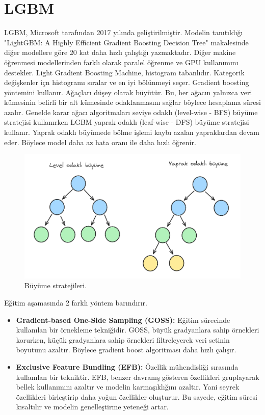 \section{LGBM}
LGBM, Microsoft tarafından 2017 yılında geliştirilmiştir. Modelin tanıtıldığı "LightGBM: A Highly Efficient Gradient Boosting Decision Tree" makalesinde diğer modellere göre 20 kat daha hızlı çalıştığı yazmaktadır. Diğer makine öğrenmesi modellerinden farklı olarak paralel öğrenme ve GPU kullanımını destekler. Light Gradient Boosting Machine, histogram tabanlıdır.  Kategorik değişkenler içn histogramı sıralar ve en iyi bölünmeyi seçer. Gradient boosting yöntemini kullanır. Ağaçları düşey olarak büyütür. Bu, her ağacın yalnızca veri kümesinin belirli bir alt kümesinde odaklanmasını sağlar böylece hesaplama süresi azalır.  Genelde karar ağacı algoritmaları seviye odaklı (level-wise - BFS) büyüme stratejisi kullanırken LGBM yaprak odaklı (leaf-wise - DFS) büyüme stratejisi kullanır. Yaprak odaklı büyümede bölme işlemi kaybı azalan yapraklardan devam eder. Böylece model daha az hata oranı ile daha hızlı öğrenir.

\begin{figure}[h]
    \centering
    \includegraphics[width=1\textwidth]{images/grow_strategies.png}
    \caption{Büyüme stratejileri.}
    \label{fig:enter-label}
\end{figure}

Eğitim aşamasında 2 farklı yöntem barındırır.
\begin{itemize}
    \item \textbf{Gradient-based One-Side Sampling (GOSS):} Eğitim sürecinde kullanılan bir örnekleme tekniğidir. GOSS, büyük gradyanlara sahip örnekleri korurken, küçük gradyanlara sahip örnekleri filtreleyerek veri setinin boyutunu azaltır. Böylece gradient boost algoritması daha hızlı çalışır.
    \item \textbf{Exclusive Feature Bundling (EFB):} Özellik mühendisliği sırasında kullanılan bir tekniktir. EFB, benzer davranış gösteren özellikleri gruplayarak bellek kullanımını azaltır ve modelin karmaşıklığını azaltır. Yani seyrek özellikleri birleştirip daha yoğun özellikler oluşturur. Bu sayede, eğitim süresi kısaltılır ve modelin genelleştirme yeteneği artar.
\end{itemize}

